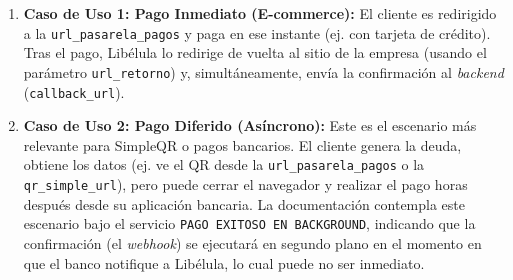         \begin{enumerate}
            \item \textbf{Caso de Uso 1: Pago Inmediato (E-commerce):} El cliente es redirigido a la \texttt{url\_pasarela\_pagos} y 
            paga en ese instante (ej. con tarjeta de crédito). Tras el pago, Libélula lo redirige de vuelta al sitio de la empresa 
            (usando el parámetro \texttt{url\_retorno}) y, simultáneamente, envía la confirmación al \emph{backend} (\texttt{callback\_url}).
            \item \textbf{Caso de Uso 2: Pago Diferido (Asíncrono):} Este es el escenario más relevante para SimpleQR o pagos bancarios. 
            El cliente genera la deuda, obtiene los datos (ej. ve el QR desde la \texttt{url\_pasarela\_pagos} o la \texttt{qr\_simple\_url}), 
            pero puede cerrar el navegador y realizar el pago horas después desde su aplicación bancaria. La documentación contempla este 
            escenario bajo el servicio \texttt{PAGO EXITOSO EN BACKGROUND}, indicando que la confirmación (el \emph{webhook}) se ejecutará 
            en segundo plano en el momento en que el banco notifique a Libélula, lo cual puede no ser inmediato.
        \end{enumerate}